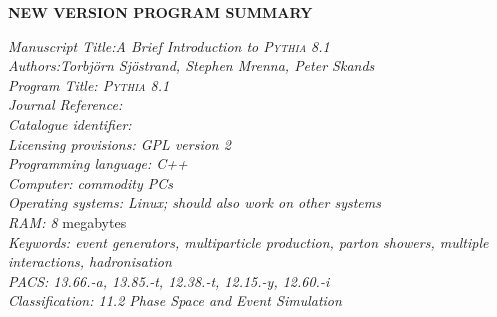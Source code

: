 \documentclass{elsartmod}
\begin{document}
\clearpage


{\bf NEW VERSION PROGRAM SUMMARY}

\begin{small}
\noindent
{\em Manuscript Title:A Brief Introduction to \textsc{Pythia} 8.1}  \\
{\em Authors:Torbj\"orn Sj\"ostrand, Stephen Mrenna, Peter Skands} \\
{\em Program Title: \textsc{Pythia} 8.1}                      \\
{\em Journal Reference:}                                      \\
{\em Catalogue identifier:}                                   \\
{\em Licensing provisions: GPL version 2}                     \\
{\em Programming language: C++}                               \\
{\em Computer: commodity PCs}                               \\
{\em Operating systems: Linux; should also work on other systems} \\
{\em RAM: 8} megabytes                                        \\
{\em Keywords: event generators, multiparticle production, 
parton showers, multiple interactions, hadronisation}         \\
{\em PACS: 13.66.-a, 13.85.-t, 12.38.-t, 12.15.-y, 12.60.-i}  \\
{\em Classification: 11.2  Phase Space and Event Simulation}   \\

\end{small}
\end{document}

